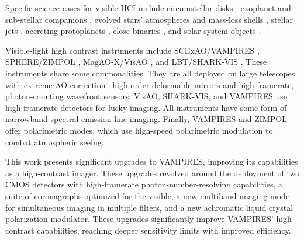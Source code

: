 Specific science cases for visible HCI include circumstellar disks \citep{benisty_optical_2023}, exoplanet and sub-stellar companions \citep{hunziker_refplanets_2020}, evolved stars' atmospheres and mass-loss shells \citep{norris_vampires_2015}, stellar jets \citep{schmid_spherezimpol_2017,uyama_monitoring_2022}, accreting protoplanets \citep{uyama_high-contrast_2020,benisty_circumplanetary_2021}, close binaries \citep{mcclure_binary_1980,escorza_barium_2019}, and solar system objects \citep{schmid_limb_2006,vernazza_vltsphere_2021}.

Visible-light high contrast instruments include SCExAO/VAMPIRES \citep{norris_vampires_2015}, SPHERE/ZIMPOL \citep{schmid_spherezimpol_2018}, MagAO-X/VisAO \citep{males_magao-x_2024}, and LBT/SHARK-VIS \citep{mattioli_shark-vis_2018}. These instruments share some commonalities. They are all deployed on large telescopes with extreme AO correction-- high-order deformable mirrors and high framerate, photon-counting wavefront sensors. VisAO, SHARK-VIS, and VAMPIRES use high-framerate detectors for lucky imaging. All instruments have some form of narrowband spectral emission line imaging. Finally, VAMPIRES and ZIMPOL offer polarimetric modes, which use high-speed polarimetric modulation to combat atmospheric seeing.

This work presents significant upgrades to VAMPIRES, improving its capabilities as a high-contrast imager. These upgrades revolved around the deployment of two CMOS detectors with high-framerate photon-number-resolving capabilities, a suite of coronagraphs optimized for the visible, a new multiband imaging mode for simultaneous imaging in multiple filters, and a new achromatic liquid crystal polarization modulator. These upgrades significantly improve VAMPIRES' high-contrast capabilities, reaching deeper sensitivity limits with improved efficiency.
